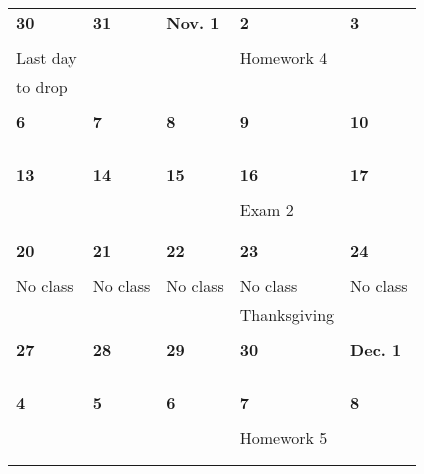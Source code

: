 \documentclass[letter, 12pt]{article}
\begin{document}
\begin{center}
\begin{tabular}{|l|l|l|l|l|}
\textbf{30} & \textbf{31} & \textbf{Nov. 1} & \textbf{2} & \textbf{3} \\
&  &  &  & \\
%
{\small Last day}&  &  &Homework 4  & \\
%
{\small to drop}&  &  &  & \\
%
&  &  &  & \\
\hline

\textbf{6} & \textbf{7} & \textbf{8} & \textbf{9} & \textbf{10} \\
&  &  &  & \\
%
&  &  & & \\
%
&  &  &  & \\
%
&  &  &  & \\
\hline

\textbf{13} & \textbf{14} & \textbf{15} & \textbf{16} & \textbf{17} \\
& &  &  & \\
%
&  &  &Exam 2  & \\
%
&  &  &  & \\
%
&  &  &  & \\
\hline

\textbf{20} & \textbf{21} & \textbf{22} & \textbf{23} & \textbf{24} \\
&  &  &  & \\
%
No class& No class  & No class  & No class & No class \\
%
&  &  & Thanksgiving & \\
%
&  &  &  & \\
\hline

\textbf{27} & \textbf{28} & \textbf{29} & \textbf{30} & \textbf{Dec. 1} \\
& &  &  & \\
%
&  &  &  & \\
%
&  &  &  & \\
%
&  &  &  & \\
\hline

\textbf{4} & \textbf{5} & \textbf{6} & \textbf{7} &\textbf{8} \\
&  &  &  & \\
%
&  &  & Homework 5 & \\
%
&  &  &  & \\
%
&  &  &  & \\
\hline
\end{tabular}
\end{center}
\end{document}
